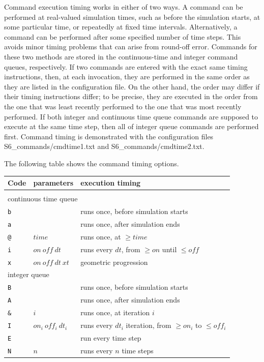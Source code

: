 \documentclass {scrbook}
\newcommand {\ttt} {\texttt}
\begin{document}
Command execution timing works in either of two ways. A command can be performed at real-valued simulation times, such as before the simulation starts, at some particular time, or repeatedly at fixed time intervals. Alternatively, a command can be performed after some specified number of time steps. This avoids minor timing problems that can arise from round-off error. Commands for these two methods are stored in the continuous-time and integer command queues, respectively. If two commands are entered with the exact same timing instructions, then, at each invocation, they are performed in the same order as they are listed in the configuration file. On the other hand, the order may differ if their timing instructions differ; to be precise, they are executed in the order from the one that was least recently performed to the one that was most recently performed. If both integer and continuous time queue commands are supposed to execute at the same time step, then all of integer queue commands are performed first. Command timing is demonstrated with the configuration files S6\_commands/cmdtime1.txt and S6\_commands/cmdtime2.txt.

The following table shows the command timing options.

\begin{longtable}[c]{lll}
Code & parameters & execution timing\\
\hline\\
\multicolumn{3}{l}{continuous time queue}\\
\ttt{b} &  & runs once, before simulation starts\\
\ttt{a} &  & runs once, after simulation ends\\
\ttt{@} & $time$ & runs once, at $\geq time$\\
\ttt{i} & $on\ off\ dt$ & runs every $dt$, from $\geq on$ until $\leq off$\\
\ttt{x} & $on\ off\ dt\ xt$ & geometric progression\\
\multicolumn{3}{l}{integer queue}\\
\ttt{B} &  & runs once, before simulation starts\\
\ttt{A} &  & runs once, after simulation ends\\
\ttt{\&} & $i$ & runs once, at iteration $i$\\
\ttt{I} & $on_i\ off_i\ dt_i$ & runs every $dt_i$ iteration, from $\geq on_i$ to $\leq off_i$\\
\ttt{E} &  & run every time step\\
\ttt{N} & $n$ & runs every $n$ time steps
\end{longtable}
\end{document}
